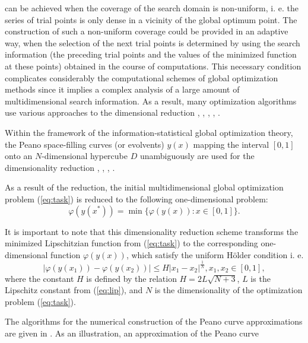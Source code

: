 \documentclass{aims}
\theoremstyle{definition}
\begin{document}
can be achieved when the coverage of the search domain is non-uniform, i. e. the series
of trial points is only dense in a vicinity of the global optimum point. The construction
of such a non-uniform coverage could be provided in an adaptive way, when the selection
of the next trial points is determined by using the search information (the preceding
trial points and the values of the minimized function at these points) obtained in the course
of computations. This necessary condition complicates considerably the computational schemes
of global optimization methods since it implies a complex analysis of a large amount
of multidimensional search information. As a result, many optimization algorithms use
various approaches to the dimensional reduction \cite{pinterGO}, \cite{sergeyevStronginLera2013}, \cite{strongin1978}, \cite{stronginGergelBarkalovParGO}, \cite{strSergGO}.
\par
Within the framework of the information-statistical global optimization theory,
the Peano space-filling curves (or evolvents) \(y(x)\) mapping the interval \([0,1]\)
onto an \(N\)-dimensional hypercube \(D\) unambiguously are used for the dimensionality
reduction \cite{sergeyevStronginLera2013}, \cite{strongin1978}, \cite{stronginGergelBarkalovParGO}, \cite{strSergGO}.
\par
As a result of the reduction, the initial multidimensional global optimization
problem (\ref{eq:task}) is reduced to the following one-dimensional problem:
\begin{equation}
\label{eq:oneDimTask}
\varphi(y(x^*))=\min\{\varphi(y(x)):x\in [0,1]\}.
\end{equation}
\par
It is important to note that this dimensionality reduction scheme transforms the minimized
Lipschitzian function from (\ref{eq:task}) to the corresponding one-dimensional
function \(\varphi(y(x))\), which satisfy the uniform H{\"o}lder condition i. e.
\begin{equation}
\label{eq:holder}
|\varphi(y(x_1))-\varphi(y(x_2))|\leq H{|x_1-x_2|}^{\frac{1}{N}}, x_1,x_2\in[0,1],
\end{equation}
where the constant $H$ is defined by the relation \(H=2L\sqrt{N+3}\), \(L\) is the Lipschitz
constant from (\ref{eq:lip}), and \(N\) is the dimensionality of the optimization problem (\ref{eq:task}).
\par
The algorithms for the numerical construction of the Peano curve approximations are
given in \cite{strSergGO}. As an illustration, an approximation of the Peano curve
\end{document}

